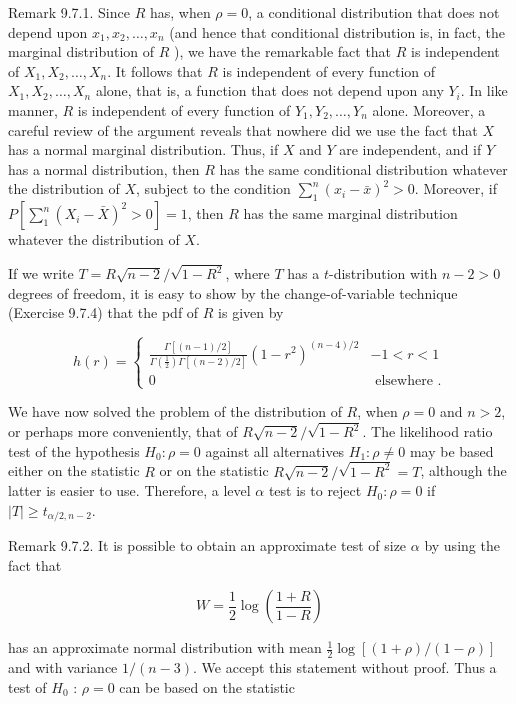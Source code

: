 Remark 9.7.1. Since $R$ has, when $\rho=0$, a conditional distribution that does not depend upon $x_{1}, x_{2}, \ldots, x_{n}$ (and hence that conditional distribution is, in fact, the marginal distribution of $R$ ), we have the remarkable fact that $R$ is independent of $X_{1}, X_{2}, \ldots, X_{n}$. It follows that $R$ is independent of every function of $X_{1}, X_{2}, \ldots, X_{n}$ alone, that is, a function that does not depend upon any $Y_{i}$. In like manner, $R$ is independent of every function of $Y_{1}, Y_{2}, \ldots, Y_{n}$ alone. Moreover, a careful review of the argument reveals that nowhere did we use the fact that $X$ has a normal marginal distribution. Thus, if $X$ and $Y$ are independent, and if $Y$ has a normal distribution, then $R$ has the same conditional distribution whatever the distribution of $X$, subject to the condition $\sum_{1}^{n}\left(x_{i}-\bar{x}\right)^{2}>0$. Moreover, if $P\left[\sum_{1}^{n}\left(X_{i}-\bar{X}\right)^{2}>0\right]=1$, then $R$ has the same marginal distribution whatever the distribution of $X$.

If we write $T=R \sqrt{n-2} / \sqrt{1-R^{2}}$, where $T$ has a $t$-distribution with $n-2>0$ degrees of freedom, it is easy to show by the change-of-variable technique (Exercise 9.7.4) that the pdf of $R$ is given by

\[
h(r)= \begin{cases}\frac{\Gamma[(n-1) / 2]}{\Gamma\left(\frac{1}{2}\right) \Gamma[(n-2) / 2]}\left(1-r^{2}\right)^{(n-4) / 2} & -1<r<1  \tag{9.7.4}\\ 0 & \text { elsewhere } .\end{cases}
\]

We have now solved the problem of the distribution of $R$, when $\rho=0$ and $n>2$, or perhaps more conveniently, that of $R \sqrt{n-2} / \sqrt{1-R^{2}}$. The likelihood ratio test of the hypothesis $H_{0}: \rho=0$ against all alternatives $H_{1}: \rho \neq 0$ may be based either on the statistic $R$ or on the statistic $R \sqrt{n-2} / \sqrt{1-R^{2}}=T$, although the latter is easier to use. Therefore, a level $\alpha$ test is to reject $H_{0}: \rho=0$ if $|T| \geq t_{\alpha / 2, n-2}$.

Remark 9.7.2. It is possible to obtain an approximate test of size $\alpha$ by using the fact that

$$
W=\frac{1}{2} \log \left(\frac{1+R}{1-R}\right)
$$

has an approximate normal distribution with mean $\frac{1}{2} \log [(1+\rho) /(1-\rho)]$ and with variance $1 /(n-3)$. We accept this statement without proof. Thus a test of $H_{0}$ : $\rho=0$ can be based on the statistic


